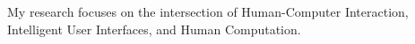 My research focuses on the intersection of Human-Computer Interaction, Intelligent User Interfaces, and Human Computation.